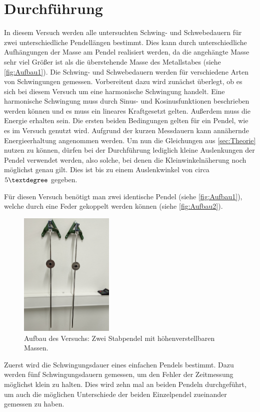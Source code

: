 \section{Durchführung}
\label{sec:Durchführung}
In diesem Versuch werden alle untersuchten Schwing- und Schwebedauern für zwei unterschiedliche Pendellängen bestimmt. Dies kann durch unterschiedliche Aufhängungen der Masse am 
Pendel realisiert werden, da die angehängte Masse sehr viel Größer ist als die überstehende Masse des Metallstabes (siehe \autoref{fig:Aufbau1}).
Die Schwing- und Schwebedauern werden für verschiedene Arten von Schwingungen gemessen. Vorbereitent dazu wird zunächst überlegt, ob es sich bei diesem Versuch um eine 
harmonische Schwingung handelt. Eine harmonische Schwingung muss durch  Sinus- und Kosinusfunktionen beschrieben werden können und es muss ein lineares Kraftgesetzt gelten.
Außerdem muss die Energie erhalten sein. Die ersten beiden Bedingungen gelten für ein Pendel, wie es im Versuch genutzt wird. Aufgrund der kurzen Messdauern kann annähernde 
Energieerhaltung angenommen werden. Um nun die Gleichungen aus \autoref{sec:Theorie} nutzen zu können, dürfen bei der Durchführung lediglich kleine Auslenkungen der Pendel 
verwendet werden, also solche, bei denen die Kleinwinkelnäherung noch möglichst genau gilt. Dies ist bis zu einem Auslenkwinkel von circa $5\textdegree$ gegeben. 


Für diesen Versuch benötigt man zwei identische Pendel (siehe \autoref{fig:Aufbau1}), welche durch eine Feder gekoppelt werden können (siehe \autoref{fig:Aufbau2}).
\begin{figure}
    \centering
    \includegraphics[width=0.4\textwidth]{content/Einzelpendel.jpg}
	\caption{Aufbau des Versuchs: Zwei Stabpendel mit höhenverstellbaren Massen.}
	\label{fig:Aufbau1}
\end{figure}
Zuerst wird die Schwingungsdauer eines einfachen Pendels bestimmt. Dazu werden fünf Schwingungsdauern gemessen, um den Fehler der Zeitmessung möglichst klein zu halten.
Dies wird zehn mal an beiden Pendeln durchgeführt, um auch die möglichen Unterschiede der beiden Einzelpendel zueinander gemessen zu haben. 


